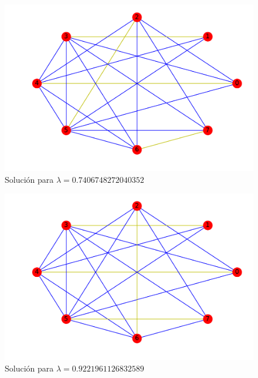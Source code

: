 \documentclass[twoside,a4paper,openright,12pt,tikz]{book}
\begin{document}
\begin{figure}[h!]
\centering
\includegraphics[scale=0.65]{opt3}
\caption{Solución para $\lambda=0.7406748272040352$}
\end{figure}


\begin{figure}[h!]
\centering
\includegraphics[scale=0.65]{opt4}
\caption{Solución para $\lambda=0.9221961126832589$}
\end{figure}
\end{document}
